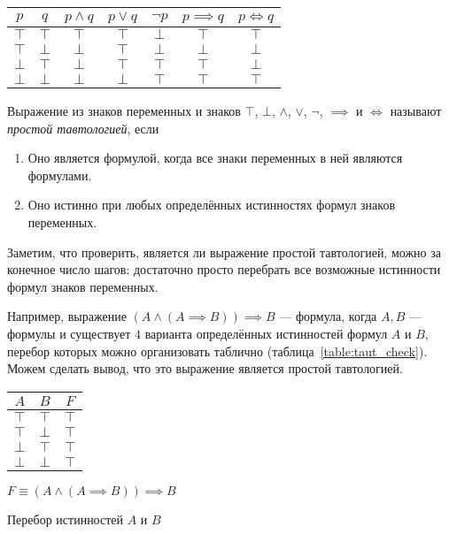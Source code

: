 \begin{center}
  \begin{tabular}{cc|ccccc}
    $p$    & $q$       & $p\land q$
           & $p\lor q$ & $\lnot p$  & $p\implies q$ & $p\iff q$                   \\\hline
    $\top$ & $\top$    & $\top$     & $\top$        & $\bot$    & $\top$ & $\top$ \\
    $\top$ & $\bot$    & $\bot$     & $\top$        & $\bot$    & $\bot$ & $\bot$ \\
    $\bot$ & $\top$    & $\bot$     & $\top$        & $\top$    & $\top$ & $\bot$ \\
    $\bot$ & $\bot$    & $\bot$     & $\bot$        & $\top$    & $\top$ & $\top$ \\
  \end{tabular}
\end{center}

Выражение из знаков переменных и знаков $\top$, $\bot$, $\land$, $\lor$, $\lnot$,
$\implies$ и $\iff$ называют
{\it простой тавтологией}, если
\begin{enumerate}
  \item{}Оно является формулой, когда все знаки переменных в ней
  являются формулами.
  \item{}Оно истинно при любых определённых истинностях формул знаков переменных.
\end{enumerate}

Заметим, что проверить, является ли выражение простой тавтологией,
можно за конечное число шагов: достаточно просто перебрать все
возможные истинности формул знаков переменных.

Например, выражение ${(A\land (A\implies B))\implies B}$ --- формула,
когда $A,B$ --- формулы и
существует $4$ варианта определённых истинностей формул $A$ и $B$,
перебор которых можно организовать таблично (таблица~\ref{table:taut_check}).
Можем сделать вывод, что это выражение является простой тавтологией.
\begin{margintable}
  \begin{tabular}{cc|c}
    $A$    & $B$    & $F$    \\\hline
    $\top$ & $\top$ & $\top$ \\
    $\top$ & $\bot$ & $\top$ \\
    $\bot$ & $\top$ & $\top$ \\
    $\bot$ & $\bot$ & $\top$
  \end{tabular}

  \vspace{0.5em}
  $F\equiv{(A\land (A\implies B))\implies B}$

  \caption{Перебор истинностей $A$ и $B$}\label{table:taut_check}
\end{margintable}

